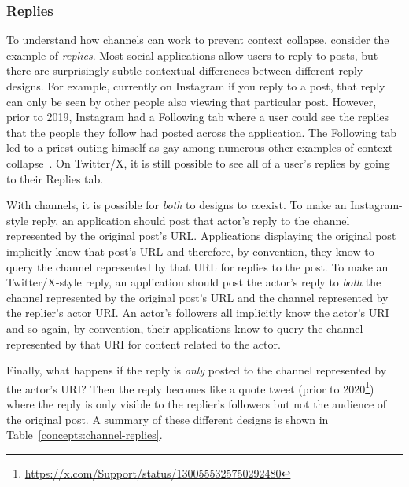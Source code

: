 

\subsubsection{Replies}

To understand how channels can work to prevent context collapse, consider the example of \emph{replies}.
Most social applications allow users to reply to posts, but there are surprisingly subtle
contextual differences between different reply designs.
For example, currently on Instagram
if you reply to a post, that reply can only be seen by other
people also viewing that particular post.
However, prior to 2019, Instagram had a Following tab where a user could see
the replies that the people they follow had posted across the application.
The Following tab led to a priest outing himself as gay among numerous other
examples of context collapse~\cite{instagramfollowingtab}.
On Twitter/X, it is still possible to see all of a user's replies by going
to their Replies tab.

With channels, it is possible for \emph{both} to designs to \emph{co}exist.
To make an Instagram-style reply,
an application should post that actor's reply to the channel
represented by the original post's URL.
Applications displaying the original post implicitly know that post's
URL and therefore,
by convention, they know to query the channel represented by that URL
for replies to the post.
To make an Twitter/X-style reply, an application should post the
actor's reply to \emph{both} the channel represented by the original post's URL
and the channel represented by the replier's actor URI.
An actor's followers all implicitly know the actor's URI and so
again, by convention, their applications know to query the channel represented by that URI
for content related to the actor.

Finally, what happens if the reply is \emph{only} posted to the
channel represented by the actor's URI?
Then the reply becomes like a quote tweet
(prior to 2020\footnote{
    \url{https://x.com/Support/status/1300555325750292480}
})
where the reply is only visible to the replier's followers but
not the audience of the original post.
A summary of these different designs is shown in Table~\ref{concepts:channel-replies}.

